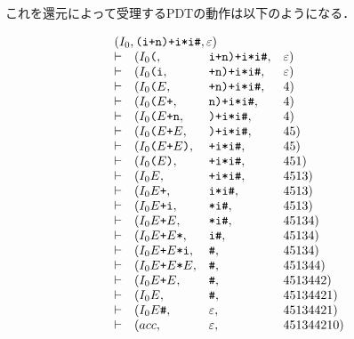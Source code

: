 \documentclass[a4j,dvipdfmx]{jbook}
\begin{document}
\begin{Exmp}
  これを還元によって受理するPDTの動作は以下のようになる．

  \[\begin{array}{clll}
      \multicolumn{4}{l}{(I_0,\texttt{(i+n)+i*i\#},\varepsilon)}                           \\
      \vdash & (I_0\texttt{(},                       & \texttt{i+n)+i*i\#}, & \varepsilon) \\
      \vdash & (I_0\texttt{(i},                      & \texttt{+n)+i*i\#},  & \varepsilon) \\
      \vdash & (I_0\texttt{(}E,                      & \texttt{+n)+i*i\#},  & 4)           \\
      \vdash & (I_0\texttt{(}E\texttt{+},            & \texttt{n)+i*i\#},   & 4)           \\
      \vdash & (I_0\texttt{(}E\texttt{+n},           & \texttt{)+i*i\#},    & 4)           \\
      \vdash & (I_0\texttt{(}E\texttt{+}E,           & \texttt{)+i*i\#},    & 45)          \\
      \vdash & (I_0\texttt{(}E\texttt{+}E\texttt{)}, & \texttt{+i*i\#},     & 45)          \\
      \vdash & (I_0\texttt{(}E\texttt{)},            & \texttt{+i*i\#},     & 451)         \\
      \vdash & (I_0E,                                & \texttt{+i*i\#},     & 4513)        \\
      \vdash & (I_0E\texttt{+},                      & \texttt{i*i\#},      & 4513)        \\
      \vdash & (I_0E\texttt{+i},                     & \texttt{*i\#},       & 4513)        \\
      \vdash & (I_0E\texttt{+}E,                     & \texttt{*i\#},       & 45134)       \\
      \vdash & (I_0E\texttt{+}E\texttt{*},           & \texttt{i\#},        & 45134)       \\
      \vdash & (I_0E\texttt{+}E\texttt{*i},          & \texttt{\#},         & 45134)       \\
      \vdash & (I_0E\texttt{+}E\texttt{*}E,          & \texttt{\#},         & 451344)      \\
      \vdash & (I_0E\texttt{+}E,                     & \texttt{\#},         & 4513442)     \\
      \vdash & (I_0E,                                & \texttt{\#},         & 45134421)    \\
      \vdash & (I_0E\texttt{\#},                     & \varepsilon,         & 45134421)    \\
      \vdash & (acc,                                 & \varepsilon,         & 451344210)   \\
    \end{array}\]
\end{Exmp}
\end{document}
